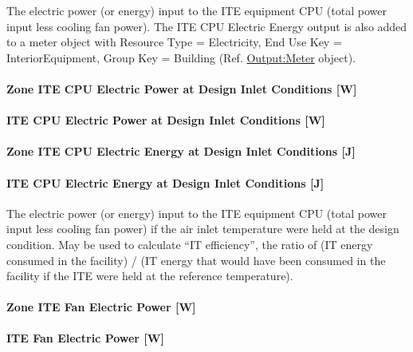 The electric power (or energy) input to the ITE equipment CPU (total power input less cooling fan power). The ITE CPU Electric Energy output is also added to a meter object with Resource Type = Electricity, End Use Key = InteriorEquipment, Group Key = Building (Ref. \hyperref[outputmeter-and-outputmetermeterfileonly]{Output:Meter} object).

\paragraph{Zone ITE CPU Electric Power at Design Inlet Conditions {[}W{]}}\label{zone-ite-cpu-electric-power-at-design-inlet-conditions-w}

\paragraph{ITE CPU Electric Power at Design Inlet Conditions {[}W{]}}\label{ite-cpu-electric-power-at-design-inlet-conditions-w}

\paragraph{Zone ITE CPU Electric Energy at Design Inlet Conditions {[}J{]}}\label{zone-ite-cpu-electric-energy-at-design-inlet-conditions-j}

\paragraph{ITE CPU Electric Energy at Design Inlet Conditions {[}J{]}}\label{ite-cpu-electric-energy-at-design-inlet-conditions-j}

The electric power (or energy) input to the ITE equipment CPU (total power input less cooling fan power) if the air inlet temperature were held at the design condition. May be used to calculate ``IT efficiency'', the ratio of (IT energy consumed in the facility) / (IT energy that would have been consumed in the facility if the ITE were held at the reference temperature).

\paragraph{Zone ITE Fan Electric Power {[}W{]}}\label{zone-ite-fan-electric-power-w}

\paragraph{ITE Fan Electric Power {[}W{]}}\label{ite-fan-electric-power-w}

